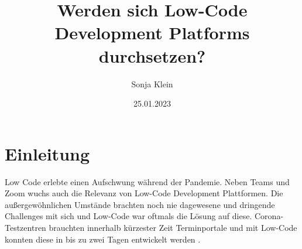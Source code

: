 \documentclass[12pt]{article} %
\title{Werden sich Low-Code Development Platforms durchsetzen?}
\author{Sonja Klein}
\date{25.01.2023}
\begin{document}
	
	
	
	
	
	
	
	\maketitle	
	\tableofcontents
	\newpage
	
	\section{Einleitung}
	Low Code erlebte einen Aufschwung während der Pandemie. Neben Teams und Zoom wuchs auch die Relevanz von Low-Code Development Plattformen. Die außergewöhnlichen Umstände brachten noch nie dagewesene und dringende Challenges mit sich und Low-Code war oftmals die Lösung auf diese. Corona-Testzentren brauchten innerhalb kürzester Zeit Terminportale und mit Low-Code konnten diese in bis zu zwei Tagen entwickelt werden 	\cite{AmyGlasscock.2021}. \newline 
	
\end{document}
